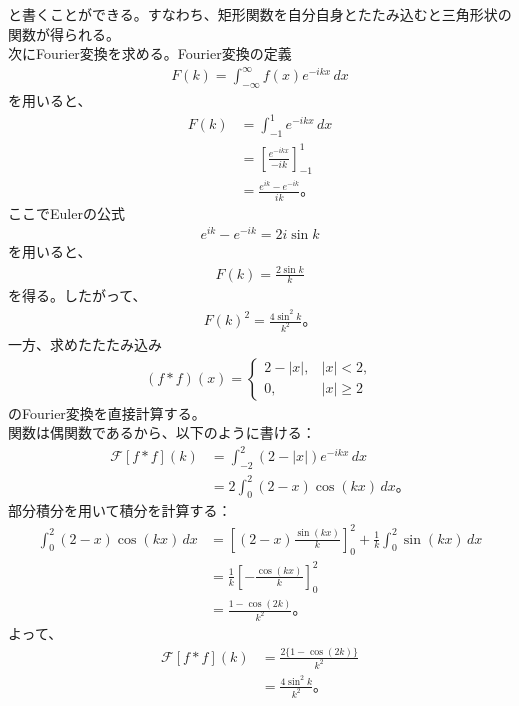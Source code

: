 \documentclass[platex,dvipdfmx,a4paper]{jsarticle}
\begin{document}
  と書くことができる。すなわち、矩形関数を自分自身とたたみ込むと三角形状の関数が得られる。\\
  次にFourier変換を求める。Fourier変換の定義
  \begin{align*}
    F(k)
    =
    \int_{-\infty}^{\infty}
    f(x)e^{-ikx}\,dx
  \end{align*}
  を用いると、
  \begin{align*}
    F(k)
    &=
    \int_{-1}^{1}
    e^{-ikx}\,dx \\
    &=
    \left[
      \frac{e^{-ikx}}{-ik}
    \right]_{-1}^{1} \\
    &=
    \frac{e^{ik}-e^{-ik}}{ik}。
  \end{align*}
  ここでEulerの公式
  \begin{align*}
    e^{ik}-e^{-ik}
    =
    2i\sin k
  \end{align*}
  を用いると、
  \begin{align*}
    F(k)
    =
    \frac{2\sin k}{k}
  \end{align*}
  を得る。したがって、
  \begin{align*}
    F(k)^2
    =
    \frac{4\sin^2 k}{k^2}。
  \end{align*}
  一方、求めたたたみ込み
  \begin{align*}
    (f*f)(x)
    =
    \begin{cases}
      2-|x|,& |x|<2,\\
      0,& |x|\ge 2
    \end{cases}
  \end{align*}
  のFourier変換を直接計算する。\\
  関数は偶関数であるから、以下のように書ける：
  \begin{align*}
    \mathcal{F}[f*f](k)
    &=
    \int_{-2}^{2}
    (2-|x|)e^{-ikx}\,dx \\
    &=
    2\int_0^2
    (2-x)\cos(kx)\,dx。
  \end{align*}
  部分積分を用いて積分を計算する：
  \begin{align*}
    \int_0^2
    (2-x)\cos(kx)\,dx
    &=
    \left[
      (2-x)\frac{\sin(kx)}{k}
    \right]_0^2
    +
    \frac{1}{k}
    \int_0^2
    \sin(kx)\,dx \\
    &=
    \frac{1}{k}
    \left[
      -\frac{\cos(kx)}{k}
    \right]_0^2 \\
    &=
    \frac{1-\cos(2k)}{k^2}。
  \end{align*}
  よって、
  \begin{align*}
    \mathcal{F}[f*f](k)
    &=
    \frac{2\{1-\cos(2k)\}}{k^2} \\
    &=
    \frac{4\sin^2 k}{k^2}。
  \end{align*}
\end{document}
